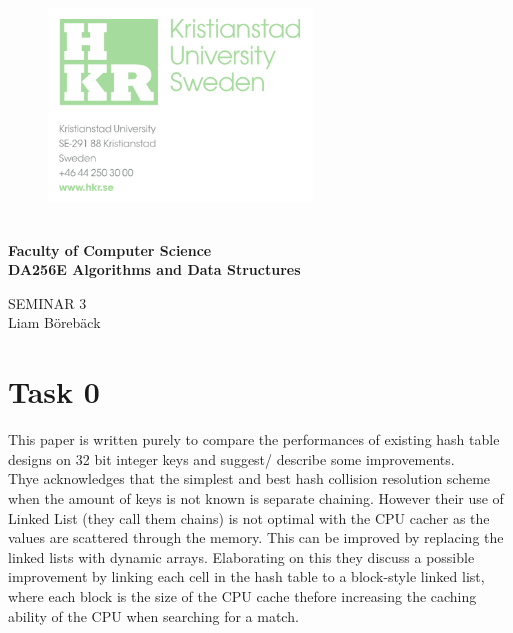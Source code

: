 \documentclass{article}
\begin{document}
	

	\begin{figure}[h!]

			\includegraphics[width=7cm]{images/hkr.png}
			\label{title}
	   \endminipage
		\endminipage
	\end{figure}
	
	\vspace{0.8cm}
	\Large

	\textbf{\\ Faculty of Computer Science\\ DA256E Algorithms and Data Structures}
	\begin{center}
	\vspace{4cm}
	\Huge
	SEMINAR 3\\
	\vspace{2cm}
	\LARGE
	Liam Börebäck
	\end{center}
	
\thispagestyle{empty}       %

\newpage
	
\tableofcontents
\large
\thispagestyle{empty}        %


\newpage

\newpage 

\section{Task 0}

This paper is written purely to compare the performances of existing hash table designs on 32 bit integer keys and suggest/ describe some improvements. \\

Thye acknowledges that the simplest and best hash collision resolution scheme when the amount of keys is not known is separate chaining. However their use of Linked List (they call them chains) is not optimal with the CPU cacher as the values are scattered through the memory. This can be improved by replacing the linked lists with dynamic arrays. Elaborating on this they discuss a possible improvement by linking each cell in the hash table to a block-style linked list, where each block is the size of the CPU cache thefore increasing the caching ability of the CPU when searching for a match. \\
\end{document}
